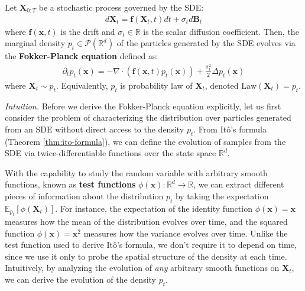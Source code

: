 \documentclass{article}
\begin{document}
\begin{theorem}\label{thm:fokker-planck}
    Let $\boldsymbol{X}_{0:T}$ be a stochastic process governed by the SDE:
    \begin{align}
        d\boldsymbol{X}_t=\boldsymbol{f}(\boldsymbol{X}_t,t)dt+ \sigma_td\boldsymbol{B}_t
    \end{align}
    where $\boldsymbol{f}(\boldsymbol{x},t)$ is the drift and $\sigma_t\in \mathbb{R}$ is the scalar diffusion coefficient. Then, the marginal density $p_t\in \mathcal{P}(\mathbb{R}^d)$ of the particles generated by the SDE evolves via the \textbf{Fokker-Planck equation} defined as:
    \begin{align}
        \partial_tp_t(\boldsymbol{x}) =-\nabla\cdot (\boldsymbol{f}(\boldsymbol{x},t)p_t(\boldsymbol{x}))+\frac{\sigma_t^2}{2}\Delta p_t(\boldsymbol{x})\tag{Fokker-Planck Equation}\label{eq:fokker-planck equation}
    \end{align}
    where $\boldsymbol{X}_t \sim p_t$. Equivalently, $p_t$ is probability law of $\boldsymbol{X}_t$, denoted $\text{Law}(\boldsymbol{X}_t)=p_t$.
\end{theorem}

\textit{Intuition.} Before we derive the Fokker-Planck equation explicitly, let us first consider the problem of characterizing the distribution over particles generated from an SDE without direct access to the density $p_t$. From Itô's formula (Theorem \ref{thm:ito-formula}), we can define the evolution of samples from the SDE via twice-differentiable functions over the state space $\mathbb{R}^d$. 

With the capability to study the random variable with arbitrary smooth functions, known as \textbf{test functions} $\phi(\boldsymbol{x}):\mathbb{R}^d\to \mathbb{R}$, we can extract different pieces of information about the distribution $p_t$ by taking the expectation $\mathbb{E}_{p_t}[\phi(\boldsymbol{X}_t)]$. For instance, the expectation of the identity function $\phi(\boldsymbol{x})=\boldsymbol{x}$ measures how the mean of the distribution evolves over time, and the squared function $\phi(\boldsymbol{x})=\boldsymbol{x}^2$ measures how the variance evolves over time. Unlike the test function used to derive Itô's formula, we don't require it to depend on time, since we use it only to probe the spatial structure of the density at each time. Intuitively, by analyzing the evolution of \textit{any} arbitrary smooth functions on $\boldsymbol{X}_t$, we can derive the evolution of the density $p_t$.
\end{document}
